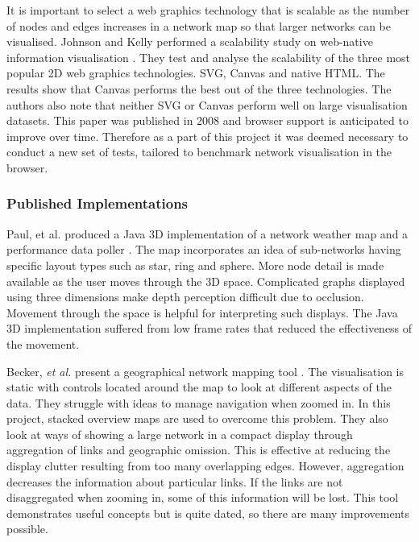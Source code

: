 \documentclass[11pt, a4paper]{article}
\begin{document}
It is important to select a web graphics technology that is scalable as the
number of nodes and edges increases in a network map so that larger networks can
be visualised. Johnson and Kelly performed a scalability study on web-native
information visualisation \cite{Johnson_2008}.  They test and analyse the
scalability of the three most popular 2D web graphics technologies.  SVG, Canvas
and native HTML. The results show that Canvas performs the best out of the three
technologies. The authors also note that neither SVG or Canvas perform well on
large visualisation datasets. This paper was published in 2008 and browser
support is anticipated to improve over time. Therefore as a part of this project
it was deemed necessary to conduct a new set of tests, tailored to benchmark
network visualisation in the browser.



\subsubsection{Published Implementations}
\label{sec:published-implementations}

Paul, et al. produced a Java 3D implementation of a network weather map and a
performance data poller \cite{Paul_2000}. The map incorporates an idea of
sub-networks having specific layout types such as star, ring and sphere. More
node detail is made available as the user moves through the 3D space.
Complicated graphs displayed using three dimensions make depth perception
difficult due to occlusion. Movement through the space is helpful for
interpreting such displays. The Java 3D implementation suffered from low frame
rates that reduced the effectiveness of the movement.


Becker, \emph{et al.} present a geographical network mapping tool \cite{Becker_1995}.
The visualisation is static with controls located around the map to look at
different aspects of the data. They struggle with ideas to manage navigation
when zoomed in. In this project, stacked overview maps are used to overcome this
problem. They also look at ways of showing a large network in a compact display
through aggregation of links and geographic omission. This is effective at
reducing the display clutter resulting from too many overlapping edges. However,
aggregation decreases the information about particular links. If the links are
not disaggregated when zooming in, some of this information will be lost. This
tool demonstrates useful concepts but is quite dated, so there are many
improvements possible.
\end{document}
